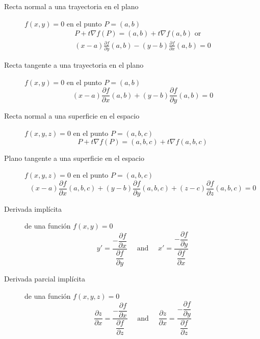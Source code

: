 \begin{multicols}{2}
\begin{tcolorbox}[hbox, title=Rectas tangente y normal en el plano]
\begin{minipage}{0.4\textwidth}
\flushleft
\begin{description}
\item[Recta normal a una trayectoria en el plano] $f(x,y)=0$ en el punto $P=(a,b)$
      \[
      \begin{array}{c}
      P+t\nabla f(P) = (a,b)+t\nabla f(a,b) \mbox{ or } \\
      (x-a)\frac{\partial f}{\partial y}(a,b)-(y-b)\frac{\partial f}{\partial x}(a,b)=0
      \end{array}
      \]
\item[Recta tangente a una trayectoria en el plano] $f(x,y)=0$ en el punto $P=(a,b)$
      \[
      (x-a)\frac{\partial f}{\partial x}(a,b)+(y-b)\frac{\partial f}{\partial y}(a,b)=0
      \]
\end{description}
\end{minipage}
\end{tcolorbox}

\begin{tcolorbox}[hbox, title=Recta normal y plano tangente en el espacio]
\begin{minipage}{0.4\textwidth}
\flushleft
\begin{description}
\item[Recta normal a una superficie en el espacio] $f(x,y,z)=0$ en el punto $P=(a,b,c)$
      \[
      P+t\nabla f(P) = (a,b,c)+t\nabla f(a,b,c)
      \]
\item[Plano tangente a una superficie en el espacio] $f(x,y,z)=0$ en el punto $P=(a,b,c)$
      \[
      (x-a)\frac{\partial f}{\partial x}(a,b,c)+(y-b)\frac{\partial f}{\partial y}(a,b,c)+(z-c)\frac{\partial f}{\partial z}(a,b,c)=0
      \]
\end{description}
\end{minipage}
\end{tcolorbox}

\begin{tcolorbox}[hbox, title=Derivadas implícitas]
\begin{minipage}{0.4\textwidth}
\flushleft
\begin{description}
\item[Derivada implícita] de una función $f(x,y)=0$
      \[
      y' = \frac{-\dfrac{\partial f}{\partial x}}{\dfrac{\partial f}{\partial y}}
      \quad \mbox{ and } \quad
      x' = \frac{-\dfrac{\partial f}{\partial y}}{\dfrac{\partial f}{\partial x}}
      \]
\item[Derivada parcial implícita] de una función $f(x,y,z)=0$
      \[
      \frac{\partial z}{\partial x} = \frac{-\dfrac{\partial f}{\partial x}}{\dfrac{\partial f}{\partial z}}
      \quad \mbox{ and } \quad
      \frac{\partial z}{\partial x} = \frac{-\dfrac{\partial f}{\partial y}}{\dfrac{\partial f}{\partial z}}
      \]
\end{description}
\end{minipage}
\end{tcolorbox}


\end{multicols}
